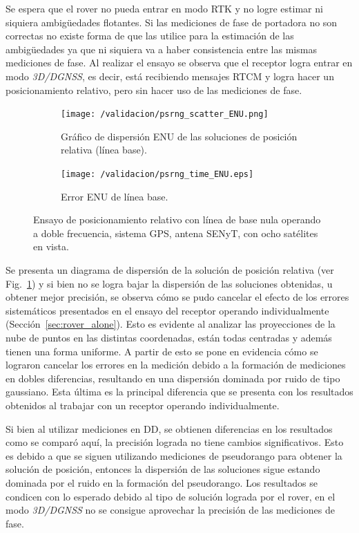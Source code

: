 \documentclass[a4paper,12pt,oneside,onecolumn,final,openright]{book}%
\begin{document}
	Se espera que el rover no pueda entrar en modo RTK y no logre estimar ni siquiera ambigüedades flotantes. Si las mediciones de fase de portadora no son correctas no existe forma de que las utilice para la estimación de las ambigüedades ya que ni siquiera va a haber consistencia entre las mismas mediciones de fase. Al realizar el ensayo se observa que el receptor logra entrar en modo \textit{3D/DGNSS}, es decir, está recibiendo mensajes RTCM y logra hacer un posicionamiento relativo, pero sin hacer uso de las mediciones de fase. 
\begin{figure}
\begin{subfigure}{1\linewidth}
\centering
  	\texttt{[image: /validacion/psrng\_scatter\_ENU.png]}
  	\caption{Gráfico de dispersión ENU de las soluciones de posición relativa (línea base).}
    \label{fig:scatter_psrng_DGNSS_Q}
\end{subfigure}


\begin{subfigure}{1\linewidth}
\centering
 	\texttt{[image: /validacion/psrng\_time\_ENU.eps]}
 	\caption{Error ENU de línea base.}
  	\label{fig:error_psrng_DGNSS_Q}

\end{subfigure}
\caption{Ensayo de posicionamiento relativo con línea de base nula operando a doble frecuencia, sistema GPS, antena SENyT, con ocho satélites en vista.}
\label{fig:ensayoDGNSS_psrng_Q}
\end{figure}

	Se presenta un diagrama de dispersión de la solución de posición relativa (ver Fig.~\ref{fig:scatter_psrng_DGNSS_Q}) y si bien no se logra bajar la dispersión de las soluciones obtenidas, u obtener mejor precisión, se observa cómo se pudo cancelar el efecto de los errores sistemáticos presentados en el ensayo del receptor operando individualmente (Sección~\ref{sec:rover_alone}). Esto es evidente al analizar las proyecciones de la nube de puntos en las distintas coordenadas, están todas centradas y además tienen una forma uniforme. A partir de esto se pone en evidencia cómo se lograron cancelar los errores en la medición debido a la formación de mediciones en dobles diferencias, resultando en una dispersión dominada por ruido de tipo gaussiano. Esta última es la principal diferencia que se presenta con los resultados obtenidos al trabajar con un receptor operando individualmente.
	
	Si bien al utilizar mediciones en DD, se obtienen diferencias en los resultados como se comparó aquí, la precisión lograda no tiene cambios significativos. Esto es debido a que se siguen utilizando mediciones de pseudorango para obtener la solución de posición, entonces la dispersión de las soluciones sigue estando dominada por el ruido en la formación del pseudorango. Los resultados se condicen con lo esperado debido al tipo de solución lograda por el rover, en el modo \textit{3D/DGNSS} no se consigue aprovechar la precisión de las mediciones de fase.
	
\end{document}
